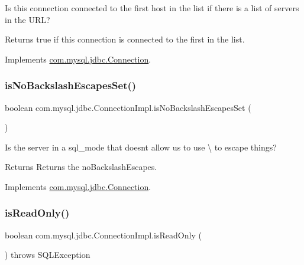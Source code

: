 Is this connection connected to the first host in the list if there is a list of servers in the U\+RL?

\begin{DoxyReturn}{Returns}
true if this connection is connected to the first in the list. 
\end{DoxyReturn}


Implements \mbox{\hyperlink{interfacecom_1_1mysql_1_1jdbc_1_1_connection_a39d6c162da8f21b7c2a3299f91e7c65a}{com.\+mysql.\+jdbc.\+Connection}}.

\mbox{\label{classcom_1_1mysql_1_1jdbc_1_1_connection_impl_afe154ffa9d2d89f6a63cf352f86f357e}} 
\subsubsection{\texorpdfstring{is\+No\+Backslash\+Escapes\+Set()}{isNoBackslashEscapesSet()}}
{\footnotesize\ttfamily boolean com.\+mysql.\+jdbc.\+Connection\+Impl.\+is\+No\+Backslash\+Escapes\+Set (\begin{DoxyParamCaption}{ }\end{DoxyParamCaption})}

Is the server in a sql\+\_\+mode that doesn\textquotesingle{}t allow us to use \textbackslash{} to escape things?

\begin{DoxyReturn}{Returns}
Returns the no\+Backslash\+Escapes. 
\end{DoxyReturn}


Implements \mbox{\hyperlink{interfacecom_1_1mysql_1_1jdbc_1_1_connection_a3465592f69365c9572cc404ae04375b4}{com.\+mysql.\+jdbc.\+Connection}}.

\mbox{\label{classcom_1_1mysql_1_1jdbc_1_1_connection_impl_a0f33455b0ae2424d31aad824e09f6672}} 
\subsubsection{\texorpdfstring{is\+Read\+Only()}{isReadOnly()}\hspace{0.1cm}{\footnotesize\ttfamily [1/2]}}
{\footnotesize\ttfamily boolean com.\+mysql.\+jdbc.\+Connection\+Impl.\+is\+Read\+Only (\begin{DoxyParamCaption}{ }\end{DoxyParamCaption}) throws S\+Q\+L\+Exception}

